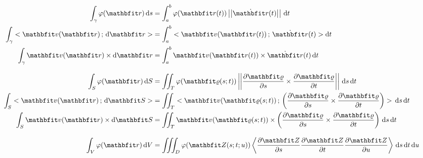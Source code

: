 \documentclass[lang=magyar]{math-handout}
\begin{document}
\vfill

\begin{block}
  \vspace*{-2em}
  \begin{align*}
    \int_\gamma \varphi(\rvec r) \, \diff s
     & =
    \int_a^b \varphi(\rvec r(t)) \norma{\dot{\rvec r}(t)} \, \diff t
    \\
    \int_\gamma \scalar{\rvec v(\rvec r)}{\diff \rvec r}
     & =
    \int_a^b \scalar{\rvec v(\rvec r(t))}{\dot{\rvec r}(t)} \diff t
    \\
    \int_\gamma \rvec v(\rvec r) \times \diff \rvec r
     & =
    \int_a^b \rvec v(\rvec r(t)) \times \dot{\rvec r}(t) \, \diff t
    \\[3mm]
    \int_S \varphi (\rvec r) \, \diff S
     & =
    \iint_T \varphi (\rvec \varrho(s; t))
    \norma{\pdv{\rvec \varrho}{s} \times \pdv{\rvec \varrho}{t}}
    \, \diff s \, \diff t
    \\
    \int_S \scalar{\rvec v (\rvec r)}{\diff \rvec S}
     & =
    \iint_T \scalar
    {\rvec v (\rvec \varrho(s; t))}
    {\left(\pdv{\rvec \varrho}{s} \times \pdv{\rvec \varrho}{t}\right)}
    \, \diff s \, \diff t
    \\
    \int_S \rvec v (\rvec r) \times \diff \rvec S
     & =
    \iint_T {\rvec v (\rvec \varrho(s; t))} \times
    \left(\pdv{\rvec \varrho}{s} \times \pdv{\rvec \varrho}{t}\right)
    \, \diff s \, \diff t
    \\[3mm]
    \int_V \varphi (\rvec r) \, \diff V
     & =
    \iiint_D \varphi (\rvec Z(s; t; u))
    \left\langle\pdv{\rvec Z}{s}\pdv{\rvec Z}{t}\pdv{\rvec Z}{u}\right\rangle
    \, \diff s \, \diff t \, \diff u
  \end{align*}
\end{block}

\clearpage
\newcommand{\bitem}[1]{\bullet\; \textbf{{#1}}}
\end{document}
